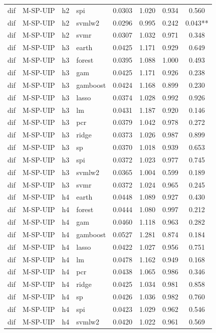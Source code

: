 \begin{ThreePartTable}
\begin{longtable}[t]{llclcccc}
dif & M-SP-UIP & h2 & spi & 0.0303 & 1.020 & 0.934 & 0.560\\
dif & M-SP-UIP & h2 & svmlw2 & 0.0296 & 0.995 & 0.242 & 0.043**\\
dif & M-SP-UIP & h2 & svmr & 0.0307 & 1.032 & 0.971 & 0.348\\
\addlinespace
dif & M-SP-UIP & h3 & earth & 0.0425 & 1.171 & 0.929 & 0.649\\
dif & M-SP-UIP & h3 & forest & 0.0395 & 1.088 & 1.000 & 0.493\\
dif & M-SP-UIP & h3 & gam & 0.0425 & 1.171 & 0.926 & 0.238\\
dif & M-SP-UIP & h3 & gamboost & 0.0424 & 1.168 & 0.899 & 0.230\\
dif & M-SP-UIP & h3 & lasso & 0.0374 & 1.028 & 0.992 & 0.926\\
dif & M-SP-UIP & h3 & lm & 0.0431 & 1.187 & 0.920 & 0.146\\
dif & M-SP-UIP & h3 & pcr & 0.0379 & 1.042 & 0.978 & 0.272\\
dif & M-SP-UIP & h3 & ridge & 0.0373 & 1.026 & 0.987 & 0.899\\
dif & M-SP-UIP & h3 & sp & 0.0370 & 1.018 & 0.939 & 0.653\\
dif & M-SP-UIP & h3 & spi & 0.0372 & 1.023 & 0.977 & 0.745\\
dif & M-SP-UIP & h3 & svmlw2 & 0.0365 & 1.004 & 0.599 & 0.189\\
dif & M-SP-UIP & h3 & svmr & 0.0372 & 1.024 & 0.965 & 0.245\\
\addlinespace
dif & M-SP-UIP & h4 & earth & 0.0448 & 1.089 & 0.927 & 0.430\\
dif & M-SP-UIP & h4 & forest & 0.0444 & 1.080 & 0.997 & 0.212\\
dif & M-SP-UIP & h4 & gam & 0.0460 & 1.118 & 0.963 & 0.282\\
dif & M-SP-UIP & h4 & gamboost & 0.0527 & 1.281 & 0.874 & 0.184\\
dif & M-SP-UIP & h4 & lasso & 0.0422 & 1.027 & 0.956 & 0.751\\
dif & M-SP-UIP & h4 & lm & 0.0478 & 1.162 & 0.949 & 0.168\\
dif & M-SP-UIP & h4 & pcr & 0.0438 & 1.065 & 0.986 & 0.346\\
dif & M-SP-UIP & h4 & ridge & 0.0425 & 1.034 & 0.981 & 0.858\\
dif & M-SP-UIP & h4 & sp & 0.0426 & 1.036 & 0.982 & 0.760\\
dif & M-SP-UIP & h4 & spi & 0.0423 & 1.029 & 0.962 & 0.546\\
dif & M-SP-UIP & h4 & svmlw2 & 0.0420 & 1.022 & 0.961 & 0.569\\

\end{longtable}
\end{ThreePartTable}
